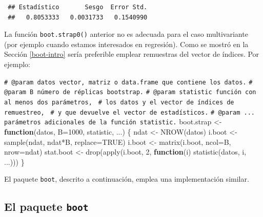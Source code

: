 \documentclass[
  10pt,
]{book}
\newenvironment{Shaded}{\begin{snugshade}}{\end{snugshade}}
\newcommand{\AttributeTok}[1]{\textcolor[rgb]{0.77,0.63,0.00}{#1}}
\newcommand{\CommentTok}[1]{\textcolor[rgb]{0.56,0.35,0.01}{\textit{#1}}}
\newcommand{\ConstantTok}[1]{\textcolor[rgb]{0.00,0.00,0.00}{#1}}
\newcommand{\ControlFlowTok}[1]{\textcolor[rgb]{0.13,0.29,0.53}{\textbf{#1}}}
\newcommand{\DecValTok}[1]{\textcolor[rgb]{0.00,0.00,0.81}{#1}}
\newcommand{\FunctionTok}[1]{\textcolor[rgb]{0.00,0.00,0.00}{#1}}
\newcommand{\NormalTok}[1]{#1}
\newcommand{\OtherTok}[1]{\textcolor[rgb]{0.56,0.35,0.01}{#1}}
\newcommand{\SpecialCharTok}[1]{\textcolor[rgb]{0.00,0.00,0.00}{#1}}
\theoremstyle{break}
\theoremstyle{nonumberplain}
\renewcommand{\CommentTok}[1]{\textcolor[rgb]{0.41,0.41,0.41}{\texttt{#1}}}
\begin{document}
\begin{verbatim}
 ## Estadístico       Sesgo  Error Std. 
 ##   0.8053333   0.0031733   0.1540990
\end{verbatim}

La función \texttt{boot.strap0()} anterior no es adecuada para el caso multivariante
(por ejemplo cuando estamos interesados en regresión).
Como se mostró en la Sección \ref{boot-intro}
sería preferible emplear remuestras del vector de índices. Por ejemplo:

\begin{Shaded}
\begin{Highlighting}[]
\CommentTok{\#\textquotesingle{} @param datos vector, matriz o data.frame que contiene los datos.}
\CommentTok{\#\textquotesingle{} @param B número de réplicas bootstrap.}
\CommentTok{\#\textquotesingle{} @param statistic función con al menos dos parámetros, }
\CommentTok{\#\textquotesingle{} los datos y el vector de índices de remuestreo, }
\CommentTok{\#\textquotesingle{} y que devuelve el vector de estadísticos.}
\CommentTok{\#\textquotesingle{} @param ... parámetros adicionales de la función statistic.}
\NormalTok{boot.strap }\OtherTok{\textless{}{-}} \ControlFlowTok{function}\NormalTok{(datos, }\AttributeTok{B=}\DecValTok{1000}\NormalTok{, statistic, ...) \{}
\NormalTok{  ndat }\OtherTok{\textless{}{-}} \FunctionTok{NROW}\NormalTok{(datos)}
\NormalTok{  i.boot }\OtherTok{\textless{}{-}} \FunctionTok{sample}\NormalTok{(ndat, ndat}\SpecialCharTok{*}\NormalTok{B, }\AttributeTok{replace=}\ConstantTok{TRUE}\NormalTok{)}
\NormalTok{  i.boot }\OtherTok{\textless{}{-}} \FunctionTok{matrix}\NormalTok{(i.boot, }\AttributeTok{ncol=}\NormalTok{B, }\AttributeTok{nrow=}\NormalTok{ndat)}
\NormalTok{  stat.boot }\OtherTok{\textless{}{-}} \FunctionTok{drop}\NormalTok{(}\FunctionTok{apply}\NormalTok{(i.boot, }\DecValTok{2}\NormalTok{, }\ControlFlowTok{function}\NormalTok{(i) }\FunctionTok{statistic}\NormalTok{(datos, i, ...)))}
\NormalTok{\}}
\end{Highlighting}
\end{Shaded}

El paquete \texttt{boot}, descrito a continuación, emplea una implementación similar.

\hypertarget{intro-pkgboot}{%
\subsection{\texorpdfstring{El paquete \texttt{boot}}{El paquete boot}}\label{intro-pkgboot}}
\end{document}
